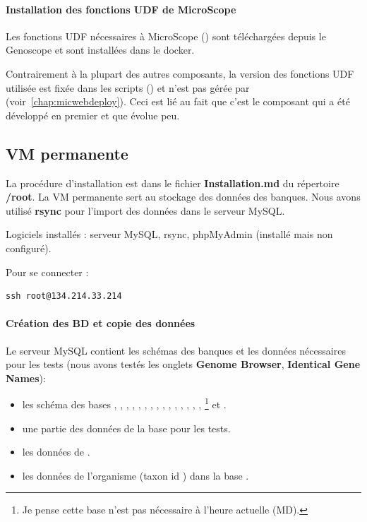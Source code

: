 \paragraph*{Installation des fonctions UDF de MicroScope}

Les fonctions UDF nécessaires à MicroScope ()
sont téléchargées depuis le Genoscope et
sont installées dans le docker.

\begin{mycolorbox}
    Contrairement à la plupart des autres composants, la version des fonctions UDF utilisée
    est fixée dans les scripts (\micUDFVersion) et n'est pas gérée par \micWEBdeployVer{} (voir~\autoref{chap:micwebdeploy}).
    Ceci est lié au fait que c'est le composant qui a été développé en premier
    et que  évolue peu.
\end{mycolorbox}

\subsection {VM permanente}\label{VMpermanente}

La procédure d'installation est dans le fichier \textbf{Installation.md} du répertoire \textbf{/root}. La VM permanente sert au stockage des données des banques. Nous avons utilisé \textbf{rsync} pour l'import des données dans le serveur MySQL.

Logiciels installés : serveur MySQL, rsync, phpMyAdmin (installé mais non configuré).

Pour se connecter :
\begin{lstlisting}[style=bash]
ssh root@134.214.33.214
\end{lstlisting}

\paragraph*{Création des BD et copie des données}

Le serveur MySQL contient les schémas des banques et les données nécessaires pour les tests (nous avons testés les onglets \textbf{Genome Browser}, \textbf{Identical Gene Names}):
\begin{itemize}
    \item les schéma des bases , , , , , , , ,
          , , , , , , , \footnote{Je pense cette base n'est pas nécessaire à l'heure actuelle (MD).}
          et .
    \item une partie des données de la base  pour les tests.
    \item les données de .
    \item les données de l'organisme \theOrg{} (taxon id \theTaxID{}) dans la base .
\end{itemize}

